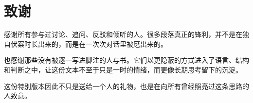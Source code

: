 \chapter*{致谢}

感谢所有参与过讨论、追问、反驳和倾听的人。很多段落真正的锋利，并不是在独自伏案时长出来的，而是在一次次对话里被磨出来的。

也感谢那些没有被逐一写进脚注的人与书。它们以更隐蔽的方式进入了语言、结构和判断之中，让这份文本不至于只是一时的情绪，而更像长期思考留下的沉淀。

这份特别版本因此不只是送给一个人的礼物，也是在向所有曾经照亮过这条思路的人致意。

